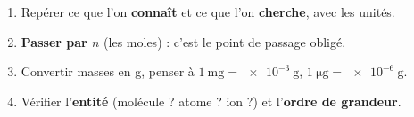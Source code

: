 \documentclass[11pt,a4paper]{article}
\begin{document}
\begin{methode}
\begin{enumerate}[leftmargin=1.5em,topsep=1pt,itemsep=1pt]
  \item Repérer ce que l'on \textbf{connaît} et ce que l'on \textbf{cherche}, avec les unités.
  \item \textbf{Passer par $n$} (les moles) : c'est le point de passage obligé.
  \item Convertir masses en g, penser à $\SI{1}{\milli\gram}=\SI{e-3}{\gram}$,
        $\SI{1}{\micro\gram}=\SI{e-6}{\gram}$.
  \item Vérifier l'\textbf{entité} (molécule ? atome ? ion ?) et l'\textbf{ordre de grandeur}.
\end{enumerate}
\end{methode}
\end{document}
